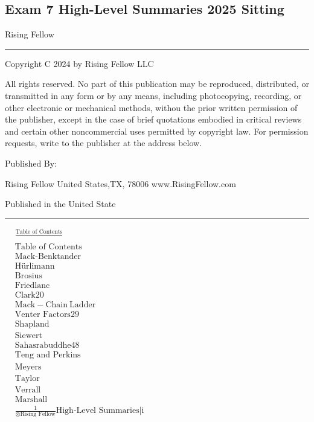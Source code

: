 \documentclass[
]{article}
\author{}
\date{}
\begin{document}
\subsection{Exam 7 High-Level Summaries 2025
Sitting}\label{exam-7-high-level-summaries-2025-sitting}

Rising Fellow

\begin{center}\rule{0.5\linewidth}{0.5pt}\end{center}

Copyright C 2024 by Rising Fellow LLC

All rights reserved. No part of this publication may be reproduced,
distributed, or transmitted in any form or by any means, including
photocopying, recording, or other electronic or mechanical methods,
withou the prior written permission of the publisher, except in the case
of brief quotations embodied in critical reviews and certain other
noncommercial uses permitted by copyright law. For permission requests,
write to the publisher at the address below.

Published By:

Rising Fellow United States,TX, 78006 www.RisingFellow.com

Published in the United State

\begin{center}\rule{0.5\linewidth}{0.5pt}\end{center}

\(\begin{aligned}
&\frac{\text{Table of Contents}}{} \\
&\text{Table of Contents} \\
&\text{Mack-Benktander} \\
&\text{Hürlimann} \\
&\text{Brosius} \\
&\text{Friedlanc} \\
&\text{Clark} \text{20}  \\
&\mathrm{Mack-Chain~Ladder} \\
&\text{Venter Factors} \text{29}  \\
&\text{Shapland} \\
&\text{Siewert} \\
&\text{Sahasrabuddhe} \text{48}  \\
&\text{Teng and Perkins} \\
&\text{Meyers} \\
&\text{Taylor} \\
&\text{Verrall} \\
&\text{Marshall} \\
&\frac1{\otimes\text{Rising Fellow}}\text{High-Level Summaries|i}
\end{aligned}\)
\end{document}
